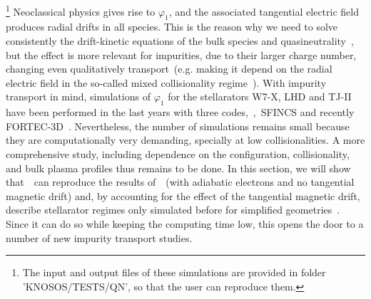 \footnote{The input and output files of these simulations are provided in folder 'KNOSOS/TESTS/QN', so that the user can reproduce them.} Neoclassical physics gives rise to $\varphi_1$, and the associated tangential electric field produces radial drifts in all species. This is the reason why we need to solve consistently the drift-kinetic equations of the bulk species and quasineutrality~\citep{calvo2017sqrtnu}, but the effect is more relevant for impurities, due to their larger charge number, changing even qualitatively transport~(e.g. making it depend on the radial electric field in the so-called mixed collisionality regime~\citep{calvo2018nf,buller2018jpp}).  With impurity transport in mind, simulations of $\varphi_1$ for the stellarators W7-X, LHD and TJ-II have been performed in the last years with three codes,~\EUTERPE,~{\ttfamily SFINCS} and recently {\ttfamily FORTEC-3D}~\citep{regana2013euterpe,regana2017phi1,regana2018phi1,mollen2018phi1,fujita2019phi1}. Nevertheless, the number of simulations remains small because they are computationally very demanding, specially at low collisionalities. A more comprehensive study, including dependence on the configuration, collisionality, and bulk plasma profiles thus remains to be done.  In this section, we will show that~\KNOSOS~can reproduce the results of~\EUTERPE~(with adiabatic electrons and no tangential magnetic drift) and, by accounting for the effect of the tangential magnetic drift, describe stellarator regimes only simulated before for simplified geometries~\citep{calvo2018jpp,velasco2018phi1}. Since it can do so while keeping the computing time low, this opens the door to a number of new impurity transport studies. 

